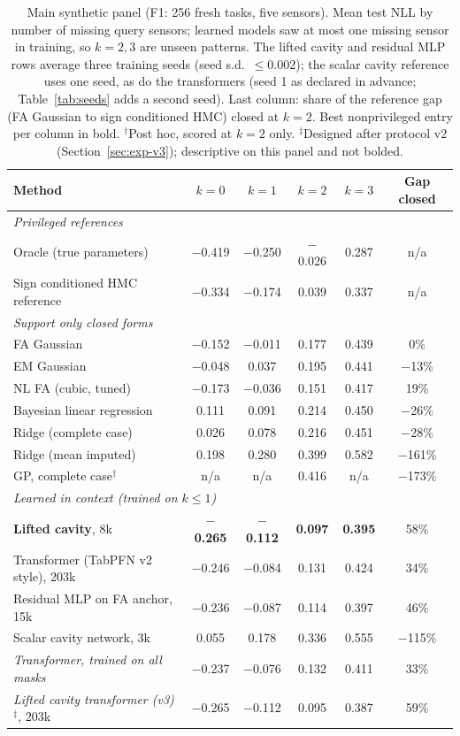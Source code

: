 \begin{table}[t]
\centering\small
\caption{\label{tab:main}Main synthetic panel (F1: 256 fresh tasks, five sensors). Mean test NLL by number of missing query sensors; learned models saw at most one missing sensor in training, so $k=2,3$ are unseen patterns. The lifted cavity and residual MLP rows average three training seeds (seed s.d.\ $\leq0.002$); the scalar cavity reference uses one seed, as do the transformers (seed 1 as declared in advance; Table~\ref{tab:seeds} adds a second seed). Last column: share of the reference gap (FA Gaussian to sign conditioned HMC) closed at $k=2$. Best nonprivileged entry per column in bold. $^\dagger$Post hoc, scored at $k=2$ only. $^\ddagger$Designed after protocol v2 (Section~\ref{sec:exp-v3}); descriptive on this panel and not bolded.}
\begin{tabular}{lccccc}
\toprule
Method & $k{=}0$ & $k{=}1$ & $k{=}2$ & $k{=}3$ & Gap closed\\
\midrule
\multicolumn{6}{l}{\emph{Privileged references}}\\
Oracle (true parameters) & $-$0.419 & $-$0.250 & $-$0.026 & 0.287 & n/a\\
Sign conditioned HMC reference & $-$0.334 & $-$0.174 & 0.039 & 0.337 & n/a\\
\midrule
\multicolumn{6}{l}{\emph{Support only closed forms}}\\
FA Gaussian & $-$0.152 & $-$0.011 & 0.177 & 0.439 & 0\%\\
EM Gaussian & $-$0.048 & 0.037 & 0.195 & 0.441 & $-$13\%\\
NL FA (cubic, tuned) & $-$0.173 & $-$0.036 & 0.151 & 0.417 & 19\%\\
Bayesian linear regression & 0.111 & 0.091 & 0.214 & 0.450 & $-$26\%\\
Ridge (complete case) & 0.026 & 0.078 & 0.216 & 0.451 & $-$28\%\\
Ridge (mean imputed) & 0.198 & 0.280 & 0.399 & 0.582 & $-$161\%\\
GP, complete case$^\dagger$ & n/a & n/a & 0.416 & n/a & $-$173\%\\
\midrule
\multicolumn{6}{l}{\emph{Learned in context (trained on $k\leq1$)}}\\
\textbf{Lifted cavity}, 8k & \textbf{$-$0.265} & \textbf{$-$0.112} & \textbf{0.097} & \textbf{0.395} & 58\%\\
Transformer (TabPFN v2 style), 203k & $-$0.246 & $-$0.084 & 0.131 & 0.424 & 34\%\\
Residual MLP on FA anchor, 15k & $-$0.236 & $-$0.087 & 0.114 & 0.397 & 46\%\\
Scalar cavity network, 3k & 0.055 & 0.178 & 0.336 & 0.555 & $-$115\%\\
\emph{Transformer, trained on all masks} & $-$0.237 & $-$0.076 & 0.132 & 0.411 & 33\%\\
\emph{Lifted cavity transformer (v3)}$^\ddagger$, 203k & $-$0.265 & $-$0.112 & 0.095 & 0.387 & 59\%\\
\bottomrule
\end{tabular}
\end{table}
